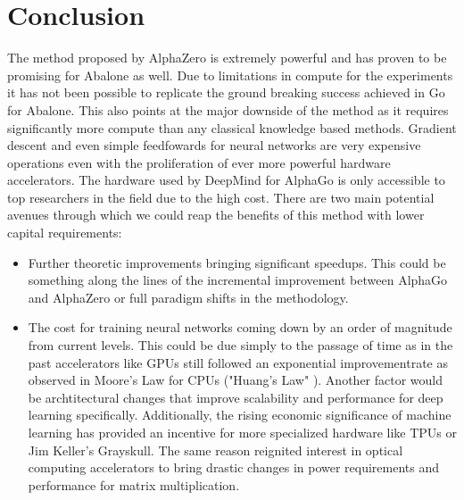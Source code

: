 \chapter{Conclusion}
The method proposed by AlphaZero is extremely powerful and has proven to be promising for Abalone as well. Due to limitations in compute for the experiments it has not been possible to replicate the ground breaking success achieved in Go for Abalone. This also points at the major downside of the method as it requires significantly more compute than any classical knowledge based methods. Gradient descent and even simple feedfowards for neural networks are very expensive operations even with the proliferation of ever more powerful hardware accelerators. The hardware used by DeepMind for AlphaGo is only accessible to top researchers in the field due to the high cost. There are two main potential avenues through which we could reap the benefits of this method with lower capital requirements:

\begin{itemize}
    \item Further theoretic improvements bringing significant speedups. This could be something along the lines of the incremental improvement between AlphaGo and AlphaZero or full paradigm shifts in the methodology.
    \item The cost for training neural networks coming down by an order of magnitude from current levels. This could be due simply to the passage of time as in the past accelerators like GPUs still followed an exponential improvementrate as observed in Moore's Law for CPUs \cite{moore_cramming_2006} ("Huang's Law" \cite{noauthor_huangs_2021}). Another factor would be archtitectural changes that improve scalability and performance for deep learning specifically. Additionally, the rising economic significance of machine learning has provided an incentive for more specialized hardware like TPUs \cite{noauthor_tpu_nodate} or Jim Keller's Grayskull. \cite{noauthor_grayskull_nodate} The same reason reignited interest in optical computing accelerators to bring drastic changes in power requirements and performance for matrix multiplication. \cite{noauthor_lightmatter_nodate,noauthor_lightelligence_nodate}
\end{itemize}